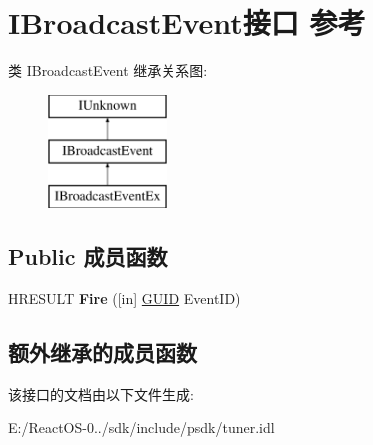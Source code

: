 \hypertarget{interface_i_broadcast_event}{}\section{I\+Broadcast\+Event接口 参考}
\label{interface_i_broadcast_event}
类 I\+Broadcast\+Event 继承关系图\+:\begin{figure}[H]
\begin{center}
\leavevmode
\includegraphics[height=3.000000cm]{interface_i_broadcast_event}
\end{center}
\end{figure}
\subsection*{Public 成员函数}
\begin{DoxyCompactItemize}
\item 
\mbox{\label{interface_i_broadcast_event_afd600513570eabfdc5f83de21a4d4043}} 
H\+R\+E\+S\+U\+LT {\bfseries Fire} (\mbox{[}in\mbox{]} \hyperlink{interface_g_u_i_d}{G\+U\+ID} Event\+ID)
\end{DoxyCompactItemize}
\subsection*{额外继承的成员函数}


该接口的文档由以下文件生成\+:\begin{DoxyCompactItemize}
\item 
E\+:/\+React\+O\+S-\/0../sdk/include/psdk/tuner.\+idl\end{DoxyCompactItemize}
